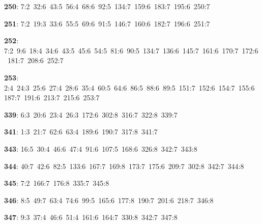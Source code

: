 \noindent \textbf{250}: 7:2\allowbreak\ 32:6\allowbreak\ 43:5\allowbreak\ 56:4\allowbreak\ 68:6\allowbreak\ 92:5\allowbreak\ 134:7\allowbreak\ 159:6\allowbreak\ 183:7\allowbreak\ 195:6\allowbreak\ 250:7\par
\noindent \textbf{251}: 7:2\allowbreak\ 19:3\allowbreak\ 33:6\allowbreak\ 55:5\allowbreak\ 69:6\allowbreak\ 91:5\allowbreak\ 146:7\allowbreak\ 160:6\allowbreak\ 182:7\allowbreak\ 196:6\allowbreak\ 251:7\par
\noindent \textbf{252}: 7:2\allowbreak\ 9:6\allowbreak\ 18:4\allowbreak\ 34:6\allowbreak\ 43:5\allowbreak\ 45:6\allowbreak\ 54:5\allowbreak\ 81:6\allowbreak\ 90:5\allowbreak\ 134:7\allowbreak\ 136:6\allowbreak\ 145:7\allowbreak\ 161:6\allowbreak\ 170:7\allowbreak\ 172:6\allowbreak\ 181:7\allowbreak\ 208:6\allowbreak\ 252:7\par
\noindent \textbf{253}: 2:4\allowbreak\ 24:3\allowbreak\ 25:6\allowbreak\ 27:4\allowbreak\ 28:6\allowbreak\ 35:4\allowbreak\ 60:5\allowbreak\ 64:6\allowbreak\ 86:5\allowbreak\ 88:6\allowbreak\ 89:5\allowbreak\ 151:7\allowbreak\ 152:6\allowbreak\ 154:7\allowbreak\ 155:6\allowbreak\ 187:7\allowbreak\ 191:6\allowbreak\ 213:7\allowbreak\ 215:6\allowbreak\ 253:7\par
\noindent \textbf{339}: 6:3\allowbreak\ 20:6\allowbreak\ 23:4\allowbreak\ 26:3\allowbreak\ 172:6\allowbreak\ 302:8\allowbreak\ 316:7\allowbreak\ 322:8\allowbreak\ 339:7\par
\noindent \textbf{341}: 1:3\allowbreak\ 21:7\allowbreak\ 62:6\allowbreak\ 63:4\allowbreak\ 189:6\allowbreak\ 190:7\allowbreak\ 317:8\allowbreak\ 341:7\par
\noindent \textbf{343}: 16:5\allowbreak\ 30:4\allowbreak\ 46:6\allowbreak\ 47:4\allowbreak\ 91:6\allowbreak\ 107:5\allowbreak\ 168:6\allowbreak\ 326:8\allowbreak\ 342:7\allowbreak\ 343:8\par
\noindent \textbf{344}: 40:7\allowbreak\ 42:6\allowbreak\ 82:5\allowbreak\ 133:6\allowbreak\ 167:7\allowbreak\ 169:8\allowbreak\ 173:7\allowbreak\ 175:6\allowbreak\ 209:7\allowbreak\ 302:8\allowbreak\ 342:7\allowbreak\ 344:8\par
\noindent \textbf{345}: 7:2\allowbreak\ 166:7\allowbreak\ 176:8\allowbreak\ 335:7\allowbreak\ 345:8\par
\noindent \textbf{346}: 8:5\allowbreak\ 49:7\allowbreak\ 63:4\allowbreak\ 74:6\allowbreak\ 99:5\allowbreak\ 165:6\allowbreak\ 177:8\allowbreak\ 190:7\allowbreak\ 201:6\allowbreak\ 218:7\allowbreak\ 346:8\par
\noindent \textbf{347}: 9:3\allowbreak\ 37:4\allowbreak\ 46:6\allowbreak\ 51:4\allowbreak\ 161:6\allowbreak\ 164:7\allowbreak\ 330:8\allowbreak\ 342:7\allowbreak\ 347:8\par
